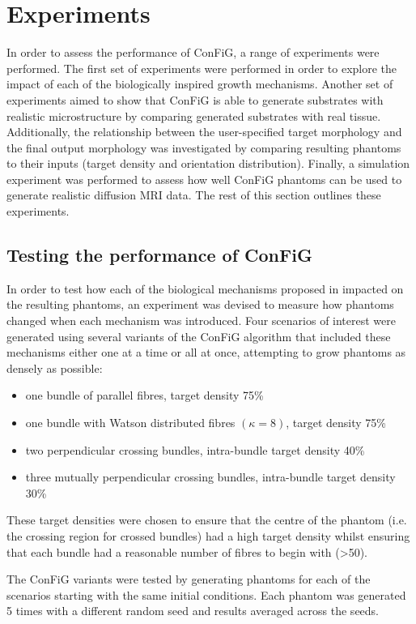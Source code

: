 \section{Experiments}
\label{sec:config_experiments}
In order to assess the performance of ConFiG, a range of experiments were performed. The first set of experiments were performed in order to explore the impact of each of the biologically inspired growth mechanisms. Another set of experiments aimed to show that ConFiG is able to generate substrates with realistic microstructure by comparing generated substrates with real tissue. Additionally, the relationship between the user-specified target morphology and the final output morphology was investigated by comparing resulting phantoms to their inputs (target density and orientation distribution). Finally, a simulation experiment was performed to assess how well ConFiG phantoms can be used to generate realistic diffusion MRI data. The rest of this section outlines these experiments.

\subsection{Testing the performance of ConFiG}
\label{sec:config_test_perf}
In order to test how each of the biological mechanisms proposed in  impacted on the resulting phantoms, an experiment was devised to measure how phantoms changed when each mechanism was introduced. Four scenarios of interest were generated using several variants of the ConFiG algorithm that included these mechanisms either one at a time or all at once, attempting to grow phantoms as densely as possible:
\begin{itemize}
  \item one bundle of parallel fibres, target density 75\%
  \item one bundle with Watson distributed fibres $(\kappa=8)$, target density 75\%
  \item two perpendicular crossing bundles, intra-bundle target density 40\%
  \item three mutually perpendicular crossing bundles, intra-bundle target density 30\%
\end{itemize}
These target densities were chosen to ensure that the centre of the phantom (i.e. the crossing region for crossed bundles) had a high target density whilst ensuring that each bundle had a reasonable number of fibres to begin with (>50).

The ConFiG variants were tested by generating phantoms for each of the scenarios starting with the same initial conditions. Each phantom was generated 5 times with a different random seed and results averaged across the seeds.


